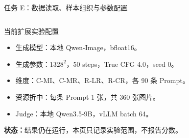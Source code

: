 \documentclass[aspectratio=169,10pt]{beamer}
\begin{document}
\begin{frame}{任务 E：数据读取、样本组织与参数配置}
\begin{columns}[T,onlytextwidth]
\begin{block}{当前扩展实验配置}
\begin{minipage}[c][4.95cm][c]{\linewidth}
\begin{itemize}
            \item 生成模型：本地 Qwen-Image，bfloat16。
            \item 生成参数：$1328^2$，50 steps，True CFG 4.0，seed 0。
            \item 维度：C-MI、C-MR、R-LR、R-CR，各 90 条 Prompt。
            \item 资源折中：每条 Prompt 1 张，共 360 张图片。
            \item Judge：本地 Qwen3.5-9B，vLLM batch 64。
          \end{itemize}
          \vspace{0.35em}
          \scriptsize\textbf{状态：}结果仍在运行，本页只记录实验范围，不报告分数。
        \end{minipage}
      \end{block}
  \end{columns}
\end{frame}
\end{document}
